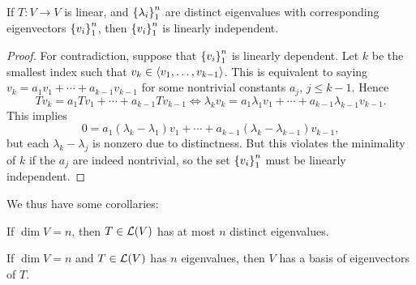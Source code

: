 \documentclass{article}
\begin{document}
\begin{theorem}
If $T: V\to V$ is linear, and $\left\{\lambda_i\right\}_1^n$ are distinct eigenvalues with corresponding eigenvectors $\left\{v_i\right\}_1^n$, then $\left\{v_i\right\}_1^n$ is linearly independent.
\end{theorem}
\begin{proof}
For contradiction, suppose that $\left\{v_i\right\}_1^n$ is linearly dependent. Let $k$ be the smallest index such that $v_k\in\left\langle v_1,\ldots, v_{k-1}\right\rangle$. This is equivalent to saying $v_k = a_1 v_1 + \cdots + a_{k-1} v_{k-1}$ for some nontrivial constants $a_j$, $j\leq k-1$. Hence
$$Tv_k = a_1Tv_1 + \cdots + a_{k-1}Tv_{k-1} \iff \lambda_kv_k = a_1\lambda_1v_1 + \cdots + a_{k-1} \lambda_{k-1}v_{k-1}.$$
This implies
$$0 = a_1(\lambda_k-\lambda_1)v_1 + \cdots + a_{k-1}(\lambda_k - \lambda_{k-1})v_{k-1},$$
but each $\lambda_k-\lambda_j$ is nonzero due to distinctness. But this violates the minimality of $k$ if the $a_j$ are indeed nontrivial, so the set $\left\{v_i\right\}_1^n$ must be linearly independent.
\end{proof}
We thus have some corollaries:
\begin{corollary}
If $\dim V = n$, then $T\in\mathcal L(V)$ has at most $n$ distinct eigenvalues.
\end{corollary}
\begin{corollary}
If $\dim V = n$ and $T\in\mathcal L(V)$ has $n$ eigenvalues, then $V$ has a basis of eigenvectors of $T$.
\end{corollary}
\end{document}
